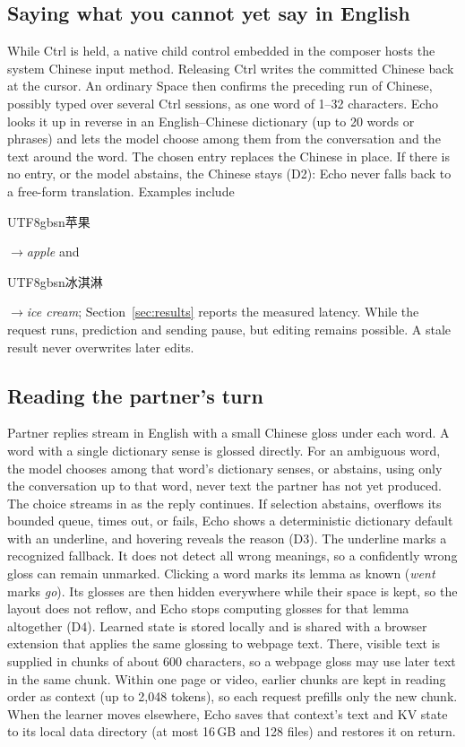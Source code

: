 \documentclass[11pt,a4paper]{article}
\newcommand{\zh}[1]{\begin{CJK}{UTF8}{gbsn}#1\end{CJK}}
\begin{document}
\subsection{Saying what you cannot yet say in English}
\label{sec:reverse}
While Ctrl is held, a native child control embedded in the composer hosts the system Chinese input method. Releasing Ctrl writes the committed Chinese back at the cursor. An ordinary Space then confirms the preceding run of Chinese, possibly typed over several Ctrl sessions, as one word of 1--32 characters. Echo looks it up in reverse in an English--Chinese dictionary (up to 20 words or phrases) and lets the model choose among them from the conversation and the text around the word. The chosen entry replaces the Chinese in place. If there is no entry, or the model abstains, the Chinese stays (D2): Echo never falls back to a free-form translation. Examples include \zh{苹果}$\to$\emph{apple} and \zh{冰淇淋}$\to$\emph{ice cream}; Section~\ref{sec:results} reports the measured latency. While the request runs, prediction and sending pause, but editing remains possible. A stale result never overwrites later edits.

\subsection{Reading the partner's turn}
Partner replies stream in English with a small Chinese gloss under each word. A word with a single dictionary sense is glossed directly. For an ambiguous word, the model chooses among that word's dictionary senses, or abstains, using only the conversation up to that word, never text the partner has not yet produced. The choice streams in as the reply continues. If selection abstains, overflows its bounded queue, times out, or fails, Echo shows a deterministic dictionary default with an underline, and hovering reveals the reason (D3). The underline marks a recognized fallback. It does not detect all wrong meanings, so a confidently wrong gloss can remain unmarked. Clicking a word marks its lemma as known (\emph{went} marks \emph{go}). Its glosses are then hidden everywhere while their space is kept, so the layout does not reflow, and Echo stops computing glosses for that lemma altogether (D4). Learned state is stored locally and is shared with a browser extension that applies the same glossing to webpage text. There, visible text is supplied in chunks of about 600 characters, so a webpage gloss may use later text in the same chunk. Within one page or video, earlier chunks are kept in reading order as context (up to 2,048 tokens), so each request prefills only the new chunk. When the learner moves elsewhere, Echo saves that context's text and KV state to its local data directory (at most 16\,GB and 128 files) and restores it on return.
\end{document}
